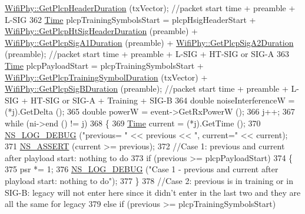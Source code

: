 \begin{DoxyCode}
      \hyperlink{classns3_1_1WifiPhy_a0f9cfd8f26cb52a1e205391064ceb6ea}{WifiPhy::GetPlcpHeaderDuration} (txVector); \textcolor{comment}{//packet start time + preamble +
       L-SIG}
362   \hyperlink{namespacens3_1_1TracedValueCallback_a7ffd3e7c142ffe7c8a1d2db9b8de38ec}{Time} plcpTrainingSymbolsStart = plcpHsigHeaderStart + 
      \hyperlink{classns3_1_1WifiPhy_a50354c8f71d8f079b9abb137c2216188}{WifiPhy::GetPlcpHtSigHeaderDuration} (preamble) + 
      \hyperlink{classns3_1_1WifiPhy_a545f41e710ce9375848c5728ac9c52a3}{WifiPhy::GetPlcpSigA1Duration} (preamble) + 
      \hyperlink{classns3_1_1WifiPhy_ab134604019ba3d13398f361ee7632f7e}{WifiPhy::GetPlcpSigA2Duration} (preamble); \textcolor{comment}{//packet start time + preamble +
       L-SIG + HT-SIG or SIG-A}
363   \hyperlink{namespacens3_1_1TracedValueCallback_a7ffd3e7c142ffe7c8a1d2db9b8de38ec}{Time} plcpPayloadStart = plcpTrainingSymbolsStart + 
      \hyperlink{classns3_1_1WifiPhy_a5446936c18b66d9fed257a5cd46b25f2}{WifiPhy::GetPlcpTrainingSymbolDuration} (txVector) + 
      \hyperlink{classns3_1_1WifiPhy_ad8021946079254f3143a1656eb8b33f6}{WifiPhy::GetPlcpSigBDuration} (preamble); \textcolor{comment}{//packet start time + preamble + L-SIG
       + HT-SIG or SIG-A + Training + SIG-B}
364   \textcolor{keywordtype}{double} noiseInterferenceW = (*j).GetDelta ();
365   \textcolor{keywordtype}{double} powerW = \textcolor{keyword}{event}->GetRxPowerW ();
366   j++;
367   \textcolor{keywordflow}{while} (ni->end () != j)
368     \{
369       \hyperlink{namespacens3_1_1TracedValueCallback_a7ffd3e7c142ffe7c8a1d2db9b8de38ec}{Time} current = (*j).GetTime ();
370       \hyperlink{group__logging_ga413f1886406d49f59a6a0a89b77b4d0a}{NS\_LOG\_DEBUG} (\textcolor{stringliteral}{"previous= "} << previous << \textcolor{stringliteral}{", current="} << current);
371       \hyperlink{assert_8h_a6dccdb0de9b252f60088ce281c49d052}{NS\_ASSERT} (current >= previous);
372       \textcolor{comment}{//Case 1: previous and current after playload start: nothing to do}
373       \textcolor{keywordflow}{if} (previous >= plcpPayloadStart)
374         \{
375           psr *= 1;
376           \hyperlink{group__logging_ga413f1886406d49f59a6a0a89b77b4d0a}{NS\_LOG\_DEBUG} (\textcolor{stringliteral}{"Case 1 - previous and current after playload start: nothing to do"});
377         \}
378       \textcolor{comment}{//Case 2: previous is in training or in SIG-B: legacy will not enter here since it didn't enter in
       the last two and they are all the same for legacy}
379       \textcolor{keywordflow}{else} \textcolor{keywordflow}{if} (previous >= plcpTrainingSymbolsStart)

\end{DoxyCode}
